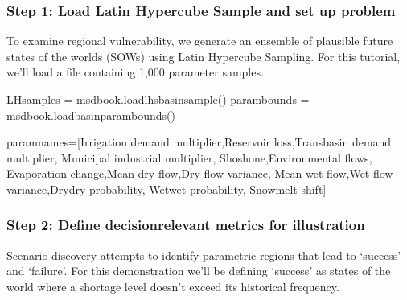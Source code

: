 \documentclass[letterpaper,10pt,english]{book}
\begin{document}
\subsubsection{Step 1: Load Latin Hypercube Sample and set up problem}
\label{\detokenize{A2_Jupyter_Notebooks:step-1-load-latin-hypercube-sample-and-set-up-problem}}
\sphinxAtStartPar
To examine regional vulnerability, we generate an ensemble of plausible
future states of the worlds (SOWs) using Latin Hypercube Sampling. For
this tutorial, we’ll load a file containing 1,000 parameter samples.

\begin{sphinxVerbatim}[commandchars=\\\{\}]
LHsamples = msdbook.load\PYGZus{}lhs\PYGZus{}basin\PYGZus{}sample()
param\PYGZus{}bounds = msdbook.load\PYGZus{}basin\PYGZus{}param\PYGZus{}bounds()

param\PYGZus{}names=[\PYGZsq{}Irrigation demand multiplier\PYGZsq{},\PYGZsq{}Reservoir loss\PYGZsq{},\PYGZsq{}Transbasin demand multiplier\PYGZsq{},
             \PYGZsq{}Municipal \PYGZam{} industrial multiplier\PYGZsq{}, \PYGZsq{}Shoshone\PYGZsq{},\PYGZsq{}Environmental flows\PYGZsq{},
             \PYGZsq{}Evaporation change\PYGZsq{},\PYGZsq{}Mean dry flow\PYGZsq{},\PYGZsq{}Dry flow variance\PYGZsq{},
             \PYGZsq{}Mean wet flow\PYGZsq{},\PYGZsq{}Wet flow variance\PYGZsq{},\PYGZsq{}Dry\PYGZhy{}dry probability\PYGZsq{},
             \PYGZsq{}Wet\PYGZhy{}wet probability\PYGZsq{}, \PYGZsq{}Snowmelt shift\PYGZsq{}]
\end{sphinxVerbatim}


\subsubsection{Step 2: Define decision\sphinxhyphen{}relevant metrics for illustration}
\label{\detokenize{A2_Jupyter_Notebooks:step-2-define-decision-relevant-metrics-for-illustration}}
\sphinxAtStartPar
Scenario discovery attempts to identify parametric regions that lead to
‘success’ and ‘failure’. For this demonstration we’ll be defining
‘success’ as states of the world where a shortage level doesn’t exceed
its historical frequency.
\end{document}
